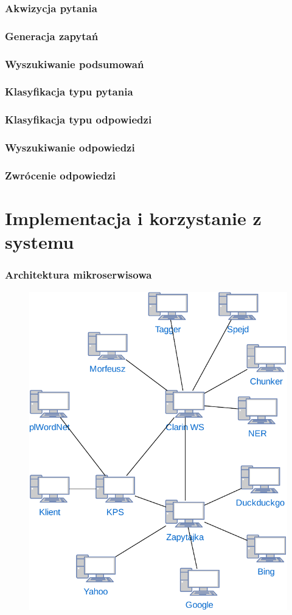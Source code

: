 \documentclass{beamer}
\begin{document}
\begin{frame}
  \frametitle{Akwizycja pytania}

\end{frame}

\begin{frame}
  \frametitle{Generacja zapytań}

\end{frame}

\begin{frame}
  \frametitle{Wyszukiwanie podsumowań}

\end{frame}

\begin{frame}
  \frametitle{Klasyfikacja typu pytania}

\end{frame}

\begin{frame}
  \frametitle{Klasyfikacja typu odpowiedzi}

\end{frame}

\begin{frame}
  \frametitle{Wyszukiwanie odpowiedzi}

\end{frame}

\begin{frame}
  \frametitle{Zwrócenie odpowiedzi}

\end{frame}

\section{Implementacja i korzystanie z systemu}
\begin{frame}
  \frametitle{Architektura mikroserwisowa}
  \begin{figure}
    \centering
    \includegraphics[width=0.5\columnwidth]{figures/WEDT-Uslugi.pdf}
    \label{fig:klient}
  \end{figure}
\end{frame}
\end{document}
